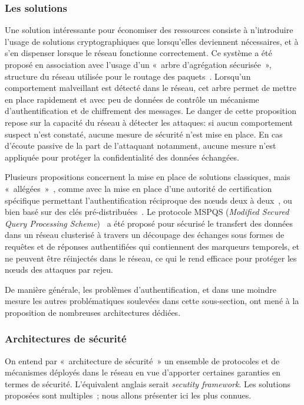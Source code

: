     \subsubsection{Les solutions}
Une solution intéressante pour économiser des ressources consiste à n'introduire l'usage de solutions cryptographiques que lorsqu'elles deviennent nécessaires, et à s'en dispenser lorsque le réseau fonctionne correctement.
Ce système a été proposé en association avec l'usage d'un « arbre d'agrégation sécurisée », structure du réseau utilisée pour le routage des paquets~\cite{WDSX07}.
Lorsqu'un comportement malveillant est détecté dans le réseau, cet arbre permet de mettre en place rapidement et avec peu de données de contrôle un mécanisme d'authentification et de chiffrement des messages.
Le danger de cette proposition repose sur la capacité du réseau à détecter les attaques: si aucun comportement suspect n'est constaté, aucune mesure de sécurité n'est mise en place.
En cas d'écoute passive de la part de l'attaquant notamment, aucune mesure n'est appliquée pour protéger la confidentialité des données échangées.

Plusieurs propositions concernent la mise en place de solutions classiques, mais « allégées »~\cite{HWMRKP06}, comme avec la mise en place d'une autorité de certification spécifique permettant l'authentification réciproque des nœuds deux à deux~\cite{GWZCK13}, ou bien basé sur des clés pré-distribuées~\cite{BSK13}.
Le protocole MSPQS (\textit{Modified Secured Query Processing Scheme})~\cite{GD14} a été proposé pour sécurisé le transfert des données dans un réseau clusterisé à travers un découpage des échanges sous formes de requêtes et de réponses authentifiées qui contiennent des marqueurs temporels, et ne peuvent être réinjectés dans le réseau, ce qui le rend efficace pour protéger les nœuds des attaques par rejeu.

De manière générale, les problèmes d'authentification, et dans une moindre mesure les autres problématiques soulevées dans cette sous-section, ont mené à la proposition de nombreuses architectures dédiées.

    \subsubsection{Architectures de sécurité}\label{ea:sss:archi}
On entend par « architecture de sécurité » un ensemble de protocoles et de mécanismes déployés dans le réseau en vue d'apporter certaines garanties en termes de sécurité.
L'équivalent anglais serait \textit{secutity framework}.
Les solutions proposées sont multiples~\cite{HI12,GWZC13,SS14-rev}; nous allons présenter ici les plus connues.

